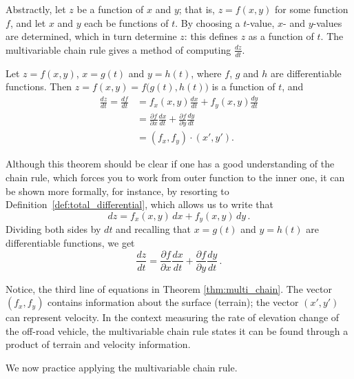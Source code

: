 Abstractly, let $z$ be a function of $x$ and $y$; that is, $z=f(x,y)$ for some function $f$, and let $x$ and $y$ each be functions of $t$. By choosing a $t$-value, $x$- and $y$-values are determined, which in turn determine $z$: this defines $z$ as a function of $t$. The multivariable chain rule gives a method of computing $ \frac{dz}{dt}$.


\begin{theorem}\label{thm:multi_chain}
Let $z=f(x,y)$, $x=g(t)$ and $y=h(t)$, where $f$, $g$ and $h$ are differentiable functions. Then \linebreak $z = f(x,y) = f\big(g(t),h(t)\big)$ is a function of $t$, and 
\begin{align}
\frac{dz}{dt} = \frac{df}{dt} &= f_x(x,y)\frac{dx}{dt}+f_y(x,y)\frac{dy}{dt}\nonumber\\[5pt]
		&= \frac{\partial f}{\partial x}\frac{dx}{dt}+\frac{\partial f}{\partial y}\frac{dy}{dt}\label{ketting1}\\[0.2cm]
		&= \left( f_x,f_y\right) \cdot \left( x',y'\right).\nonumber
\end{align}
\end{theorem}

\ifanalysis

Although this theorem should be clear if one has a good understanding of the chain rule, which forces you to work from outer function to the inner one, it can be shown more formally, for instance, by resorting to Definition~\ref{def:total_differential}, which allows us to write that
$$dz = f_x(x,y)\,dx+f_y(x,y)\,dy\,.$$
Dividing both sides by $dt$ and recalling that $x=g(t)$ and $y=h(t)$ are differentiable functions, we get
$$
\dfrac{dz}{dt}=\frac{\partial f}{\partial x}\frac{dx}{dt}+\frac{\partial f}{\partial y}\frac{dy}{dt}\,.
$$

\fi
Notice, the third line of equations in Theorem \ref{thm:multi_chain}. The vector $\left(f_x,f_y\right)$ contains information about the surface (terrain); the vector $\left( x',y'\right)$ can represent velocity. In the context measuring the rate of elevation change of the off-road vehicle, the multivariable chain rule states it can be found through a product of terrain and velocity information.


We now practice applying the multivariable chain rule.


